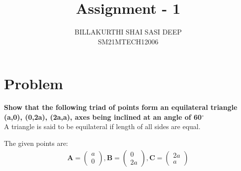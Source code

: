 \documentclass[journal,12pt,twocolumn]{IEEEtran}
\begin{document}
\providecommand{\mbf}{\mathbf}
\providecommand{\norm}[1]{$$\left\lVert#1\right\rVert$$}

\newcommand{\myvec}[1]{\ensuremath{\begin{pmatrix}#1\end{pmatrix}}}
\let\vec\mathbf

\title{
Assignment - 1
}
\author{BILLAKURTHI SHAI SASI DEEP\\ SM21MTECH12006}
\maketitle
\newpage
\bigskip

\section*{\textbf{Problem}}
\vspace{0.3cm}
\noindent
\textbf{Show that the following triad of points form an equilateral triangle \\
(a,0), (0,2a), (2a,a), axes being inclined at an angle of 60$^{\circ}$} 
\vspace{0.3cm}\\
\vspace{0.3cm}
A triangle is said to be equilateral if length of all sides are equal.
\vspace{0.6cm} 

The given points are:
\begin{align*}
\vec{A} = \myvec{a\\0}, \vec{B} =\myvec{0\\2a},
\vec{C} =\myvec{2a\\a}
\end{align*}
\end{document}
